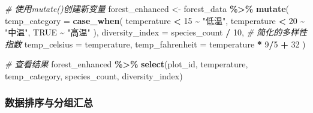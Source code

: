 \documentclass[
  twoside]{book}
\newenvironment{Shaded}{\begin{snugshade}}{\end{snugshade}}
\newcommand{\AttributeTok}[1]{\textcolor[rgb]{0.13,0.29,0.53}{#1}}
\newcommand{\CommentTok}[1]{\textcolor[rgb]{0.56,0.35,0.01}{\textit{#1}}}
\newcommand{\ConstantTok}[1]{\textcolor[rgb]{0.56,0.35,0.01}{#1}}
\newcommand{\DecValTok}[1]{\textcolor[rgb]{0.00,0.00,0.81}{#1}}
\newcommand{\FunctionTok}[1]{\textcolor[rgb]{0.13,0.29,0.53}{\textbf{#1}}}
\newcommand{\NormalTok}[1]{#1}
\newcommand{\OtherTok}[1]{\textcolor[rgb]{0.56,0.35,0.01}{#1}}
\newcommand{\SpecialCharTok}[1]{\textcolor[rgb]{0.81,0.36,0.00}{\textbf{#1}}}
\newcommand{\StringTok}[1]{\textcolor[rgb]{0.31,0.60,0.02}{#1}}
\begin{document}
\begin{Shaded}
\begin{Highlighting}[]
\CommentTok{\# 使用mutate()创建新变量}
\NormalTok{forest\_enhanced }\OtherTok{\textless{}{-}}\NormalTok{ forest\_data }\SpecialCharTok{\%\textgreater{}\%}
  \FunctionTok{mutate}\NormalTok{(}
    \AttributeTok{temp\_category =} \FunctionTok{case\_when}\NormalTok{(}
\NormalTok{      temperature }\SpecialCharTok{\textless{}} \DecValTok{15} \SpecialCharTok{\textasciitilde{}} \StringTok{"低温"}\NormalTok{,}
\NormalTok{      temperature }\SpecialCharTok{\textless{}} \DecValTok{20} \SpecialCharTok{\textasciitilde{}} \StringTok{"中温"}\NormalTok{,}
      \ConstantTok{TRUE} \SpecialCharTok{\textasciitilde{}} \StringTok{"高温"}
\NormalTok{    ),}
    \AttributeTok{diversity\_index =}\NormalTok{ species\_count }\SpecialCharTok{/} \DecValTok{10}\NormalTok{,  }\CommentTok{\# 简化的多样性指数}
    \AttributeTok{temp\_celsius =}\NormalTok{ temperature,}
    \AttributeTok{temp\_fahrenheit =}\NormalTok{ temperature }\SpecialCharTok{*} \DecValTok{9}\SpecialCharTok{/}\DecValTok{5} \SpecialCharTok{+} \DecValTok{32}
\NormalTok{  )}

\CommentTok{\# 查看结果}
\NormalTok{forest\_enhanced }\SpecialCharTok{\%\textgreater{}\%}
  \FunctionTok{select}\NormalTok{(plot\_id, temperature, temp\_category, species\_count, diversity\_index)}
\end{Highlighting}
\end{Shaded}

\hypertarget{ux6570ux636eux6392ux5e8fux4e0eux5206ux7ec4ux6c47ux603b}{%
\subsubsection{数据排序与分组汇总}\label{ux6570ux636eux6392ux5e8fux4e0eux5206ux7ec4ux6c47ux603b}}
\end{document}
